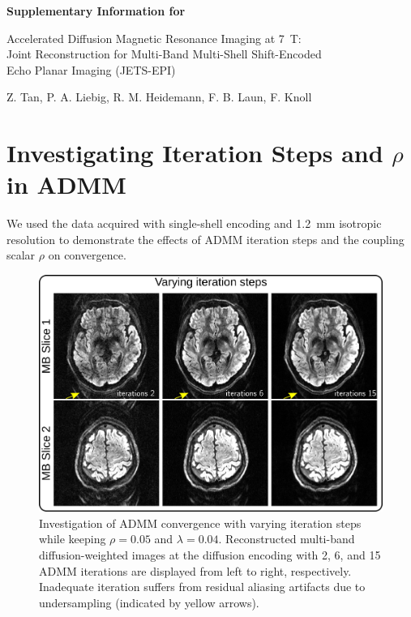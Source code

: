 \documentclass[preprint,12pt,authoryear,review]{elsarticle}
\begin{document}
	\noindent \textbf{Supplementary Information for}

	\begin{center}
		Accelerated Diffusion Magnetic Resonance Imaging at 7~T: \\
		Joint Reconstruction
		for Multi-Band Multi-Shell Shift-Encoded \\
		Echo Planar Imaging (JETS-EPI)
	\end{center}

	\begin{center}
		Z. Tan, P. A. Liebig, R. M. Heidemann, F. B. Laun, F. Knoll
	\end{center}

	\vspace{3em}

	\tableofcontents

	\clearpage

	\section{Investigating Iteration Steps and $\rho$ in ADMM}

	We used the data acquired with single-shell encoding and \SI{1.2}{\milli\meter} isotropic resolution to demonstrate the effects of ADMM iteration steps and the coupling scalar $\rho$
	on convergence.


	\begin{figure}[h!]
		\centering
		\includegraphics[width=\textwidth]{../figures/supp_fig1.png}
		\caption{Investigation of ADMM convergence with varying iteration steps
			while keeping $\rho = 0.05$ and $\lambda = 0.04$.
			Reconstructed multi-band diffusion-weighted images at the  diffusion encoding
			with 2, 6, and 15 ADMM iterations are displayed from left to right, respectively.
			Inadequate iteration suffers from residual aliasing artifacts due to undersampling
			(indicated by yellow arrows).}
		\label{FIG:conv_iter}
	\end{figure}
\end{document}
